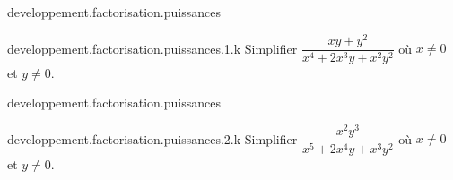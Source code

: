 \begin{qcm}{developpement.factorisation.puissances}
    \begin{question}{developpement.factorisation.puissances.1.k}
         Simplifier \(\dfrac{xy+y^2}{x^4+2x^3y+x^2y^2}\) où \(x\neq0\) et \(y\neq0\).
         \vspace{-1.5ex}
         \begin{multicols}{3}
         \begin{reponses}
             \lastchoices
              
              \phantom{foo}
         \end{reponses}
        \end{multicols}
    \end{question}
\end{qcm}

\begin{qcm}{developpement.factorisation.puissances}
    \begin{question}{developpement.factorisation.puissances.2.k}
    Simplifier \(\dfrac{x^2y^3}{x^5+2x^4y+x^3y^2}\) où \(x\neq0\) et \(y\neq0\).
         \vspace{-1.5ex}
         \begin{multicols}{3}
         \begin{reponses}
             \lastchoices
              
              \phantom{foo}
         \end{reponses}
        \end{multicols}
    \end{question}
\end{qcm}
